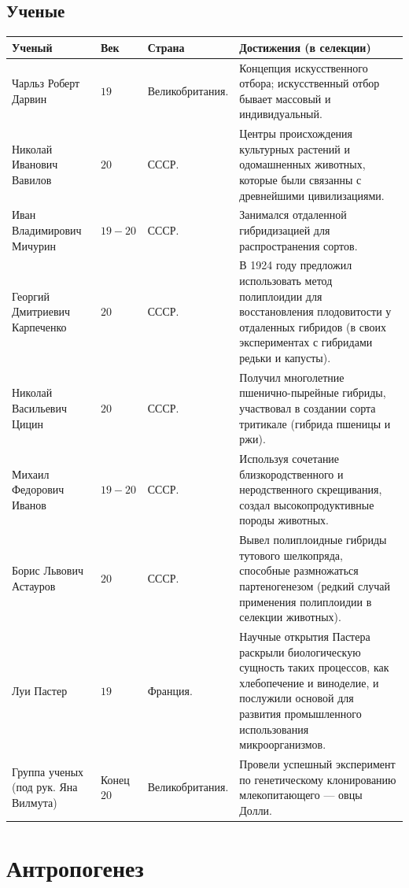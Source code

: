 \documentclass[12pt]{article}
\begin{document}
	\newpage
	
	\subsection{Ученые}
	
	\begin{xltabular}{\textwidth}{|X|p{1.7cm}|p{3.1cm}|X|}
		\hline
		\textbf{Ученый} & \textbf{Век} & \textbf{Страна} & \textbf{Достижения (в селекции)}\\
		\hline
		Чарльз Роберт Дарвин & $19$ & Великобритания. & Концепция искусственного отбора; искусственный отбор бывает массовый и индивидуальный.\\
		\hline
		Николай Иванович Вавилов & $20$ & СССР. & Центры происхождения культурных растений и одомашненных животных, которые были связанны с древнейшими цивилизациями.\\
		\hline
		Иван Владимирович Мичурин & $19 - 20$ & СССР. & Занимался отдаленной гибридизацией для распространения сортов.\\
		\hline
		Георгий Дмитриевич Карпеченко & $20$ & СССР. & В 1924 году предложил использовать метод полиплоидии для восстановления плодовитости у отдаленных гибридов (в своих экспериментах с гибридами редьки и капусты).\\
		\hline
		Николай Васильевич Цицин & $20$ & СССР. & Получил многолетние пшенично-пырейные гибриды, участвовал в создании сорта тритикале (гибрида пшеницы и ржи).\\
		\hline
		Михаил Федорович Иванов & $19 - 20$ & СССР. & Используя сочетание близкородственного и неродственного скрещивания, создал высокопродуктивные породы животных.\\
		\hline
		Борис Львович Астауров & $20$ & СССР. & Вывел полиплоидные гибриды тутового шелкопряда, способные размножаться партеногенезом (редкий случай применения полиплоидии в селекции животных).\\
		\hline
		Луи Пастер & $19$ & Франция. & Научные открытия Пастера раскрыли биологическую сущность таких процессов, как хлебопечение и виноделие, и послужили основой для развития промышленного использования микроорганизмов.\\
		\hline
		Группа ученых (под рук. Яна Вилмута) & Конец $20$ & Великобритания. & Провели успешный эксперимент по генетическому клонированию млекопитающего — овцы Долли.\\
		\hline
	\end{xltabular}
	
	
	\section{Антропогенез}
	
\end{document}
